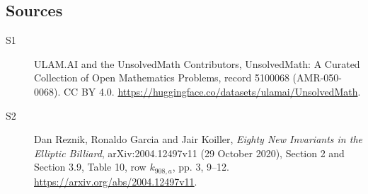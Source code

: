 \documentclass[11pt]{article}
\begin{document}
\subsection{Sources}
\begin{description}
\item[\hypertarget{source:5100068:1}{S1}] ULAM.AI and the UnsolvedMath Contributors, UnsolvedMath: A Curated Collection of Open Mathematics Problems, record 5100068 (AMR-050-0068). CC BY 4.0. \url{https://huggingface.co/datasets/ulamai/UnsolvedMath}.
\item[\hypertarget{source:5100068:2}{S2}] Dan Reznik, Ronaldo Garcia and Jair Koiller, \emph{Eighty New Invariants in the Elliptic Billiard}, arXiv:2004.12497v11 (29 October 2020), Section 2 and Section 3.9, Table 10, row $k_{908,a}$, pp. 3, 9--12. \url{https://arxiv.org/abs/2004.12497v11}.
\end{description}
\label{end:5100068}
\end{document}

